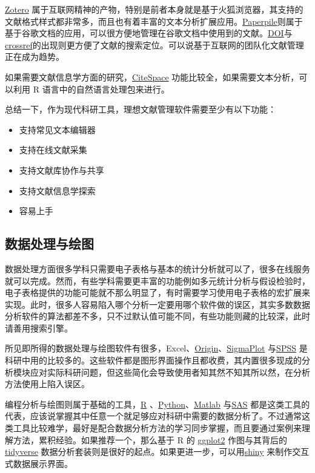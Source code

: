\documentclass[]{tufte-book}
\providecommand{\tightlist}{%
  \setlength{\itemsep}{0pt}\setlength{\parskip}{0pt}}
\begin{document}
\href{https://www.zotero.org/}{Zotero} 属于互联网精神的产物，特别是前者本身就是基于火狐浏览器，其支持的文献格式样式都非常多，而且也有着丰富的文本分析扩展应用。\href{https://paperpile.com/app}{Paperpile}则属于基于谷歌文档的应用，可以很方便地管理在谷歌文档中使用到的文献。\href{https://www.doi.org/}{DOI}与\href{https://www.crossref.org/}{crossref}的出现则更方便了文献的搜索定位。可以说基于互联网的团队化文献管理正在成为趋势。

如果需要文献信息学方面的研究，\href{http://cluster.cis.drexel.edu/~cchen/citespace/}{CiteSpace} 功能比较全，如果需要文本分析，可以利用 R 语言中的自然语言处理包来进行。

总结一下，作为现代科研工具，理想文献管理软件需要至少有以下功能：

\begin{itemize}
\tightlist
\item
  支持常见文本编辑器
\item
  支持在线文献采集
\item
  支持文献库协作与共享
\item
  支持文献信息学探索
\item
  容易上手
\end{itemize}

\hypertarget{ux6570ux636eux5904ux7406ux4e0eux7ed8ux56fe}{%
\subsection*{数据处理与绘图}\label{ux6570ux636eux5904ux7406ux4e0eux7ed8ux56fe}}

数据处理方面很多学科只需要电子表格与基本的统计分析就可以了，很多在线服务就可以完成。然而，有些学科需要更丰富的功能例如多元统计分析与假设检验时，电子表格提供的功能可能就不那么明显了，有时需要学习使用电子表格的宏扩展来实现。此时，很多人容易陷入哪个分析一定要用哪个软件做的误区，其实多数数据分析软件的算法都差不多，只不过默认值可能不同，有些功能则藏的比较深，此时请善用搜索引擎。

所见即所得的数据处理与绘图软件有很多，Excel、\href{https://www.originlab.com/}{Origin}、\href{https://systatsoftware.com/}{SigmaPlot} 与\href{https://www.ibm.com/analytics/spss-statistics-software}{SPSS} 是科研中用的比较多的。这些软件都是图形界面操作且都收费，其内置很多现成的分析模块应对实际科研问题，但这些简化会导致使用者知其然不知其所以然，在分析方法使用上陷入误区。

编程分析与绘图则属于基础的工具，\href{https://www.r-project.org/}{R} 、\href{https://www.python.org/}{Python}、\href{https://www.mathworks.com/products/matlab.html}{Matlab} 与\href{https://www.sas.com/en_us/home.html}{SAS} 都是这类工具的代表，应该说掌握其中任意一个就足够应对科研中需要的数据分析了。不过通常这类工具比较难学，最好是配合数据分析方法的学习同步掌握，而且要通过案例来理解方法，累积经验。如果推荐一个，那么基于 R 的 \href{https://ggplot2.tidyverse.org/}{ggplot2} 作图与其背后的 \href{https://www.tidyverse.org/}{tidyverse} 数据分析套装则是很好的起点。如果更进一步，可以用\href{https://www.rstudio.com/products/shiny/}{shiny} 来制作交互式数据展示界面。
\end{document}
